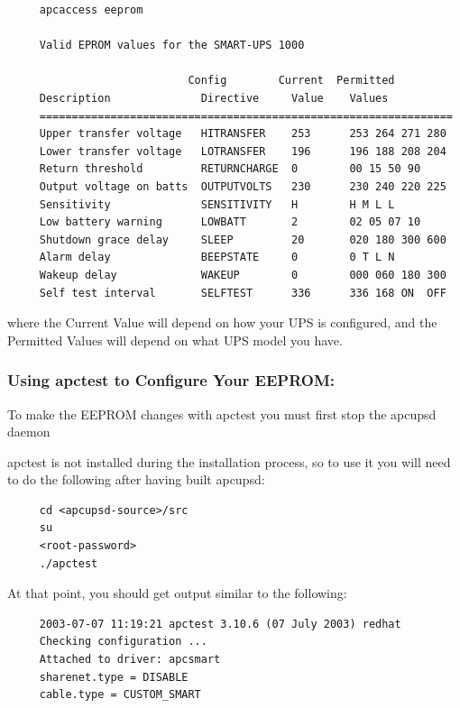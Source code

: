 {{{{{{\footnotesize
\begin{verbatim}
     apcaccess eeprom
     
     Valid EPROM values for the SMART-UPS 1000
     
                            Config        Current  Permitted
     Description              Directive     Value    Values
     ================================================================
     Upper transfer voltage   HITRANSFER    253      253 264 271 280
     Lower transfer voltage   LOTRANSFER    196      196 188 208 204
     Return threshold         RETURNCHARGE  0        00 15 50 90
     Output voltage on batts  OUTPUTVOLTS   230      230 240 220 225
     Sensitivity              SENSITIVITY   H        H M L L
     Low battery warning      LOWBATT       2        02 05 07 10
     Shutdown grace delay     SLEEP         20       020 180 300 600
     Alarm delay              BEEPSTATE     0        0 T L N
     Wakeup delay             WAKEUP        0        000 060 180 300
     Self test interval       SELFTEST      336      336 168 ON  OFF
\end{verbatim}
\normalsize

where the Current Value will depend on how your UPS is configured, and the
Permitted Values will depend on what UPS model you have. 

\label{Using-apctest-to-Configure-Your-EEPROM}

\subsubsection*{Using apctest to Configure Your EEPROM:}

\label{index-eeprom_002c-apctest-142}
\label{index-apctest-setting-eeprom-143}
To make the EEPROM changes with apctest you must first stop the apcupsd daemon
 

apctest is not installed during the installation process, so to use it you
will need to do the following after having built apcupsd: 

\footnotesize
\begin{verbatim}
     cd <apcupsd-source>/src
     su
     <root-password>
     ./apctest
\end{verbatim}
\normalsize

At that point, you should get output similar to the following: 

\footnotesize
\begin{verbatim}
     2003-07-07 11:19:21 apctest 3.10.6 (07 July 2003) redhat
     Checking configuration ...
     Attached to driver: apcsmart
     sharenet.type = DISABLE
     cable.type = CUSTOM_SMART
     

\end{verbatim}}}}}}}
